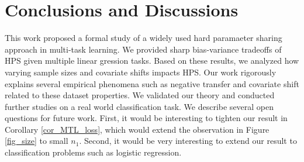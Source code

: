 \section{Conclusions and Discussions}\label{sec_conclude}

This work proposed a formal study of a widely used hard paramaeter sharing approach in multi-task learning.
We provided sharp bias-variance tradeoffs of HPS given multiple linear gression tasks.
Based on these results, we analyzed how varying sample sizes and covariate shifts impacts HPS.
Our work rigorously explains several empirical phenomena such as negative transfer and covariate shift related to these dataset properties.
We validated our theory and conducted further studies on a real world classification task.
We describe several open questions for future work.
First, it would be interesting to tighten our result in Corollary \ref{cor_MTL_loss}, which would extend the observation in Figure \ref{fig_size} to small $n_1$.
Second, it would be very interesting to extend our result to classification problems such as logistic regression.
